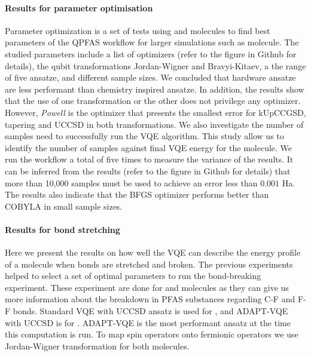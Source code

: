 \documentclass[journal,onecolumn]{IEEEtran}
\begin{document}
\paragraph{Results for parameter optimisation}

Parameter optimization is a set of tests using  and  molecules to find best parameters of the QPFAS workflow for larger simulations such as  molecule. 
%
The studied parameters include a list of optimizers (refer to the figure in Github for details), the qubit transformations Jordan-Wigner and Bravyi-Kitaev, a the range of five ansatze, and different sample sizes.
%
We concluded that hardware ansatze are less performant than chemistry inspired ansatze. 
In addition, the results show that the use of one transformation or the other does not privilege any optimizer. 
However,  \textit{Powell} is the optimizer that presents the smallest error for kUpCCGSD, tapering and UCCSD in both transformations. 
We also investigate the number of samples need to successfully run the VQE algorithm. This study allow us to identify the number of samples against final VQE energy for the  molecule. 
 We run the workflow a total of five times to measure the variance of the results. 
 It can be inferred from the results (refer to the figure in Github for details) that more than 10,000 samples must be used to achieve an error less than $0.001$ Ha.
The results also indicate that the BFGS optimizer performs better than COBYLA in small sample sizes.


\paragraph{Results for bond stretching}

Here we present the results on how well the VQE can describe the energy profile of a molecule when bonds are stretched and broken. 
The previous experiments helped to select a set of optimal parameters to run the bond-breaking experiment.
These experiment are done for  and  molecules as they can give us more information about the breakdown in PFAS substances regarding C-F and F-F bonds.
%
Standard VQE with UCCSD ansatz is used for , and ADAPT-VQE with UCCSD is for .
ADAPT-VQE is the most performant ansatz at the time this computation is run. 
To map spin operators onto fermionic operators we use Jordan-Wigner transformation for both molecules.
\end{document}
